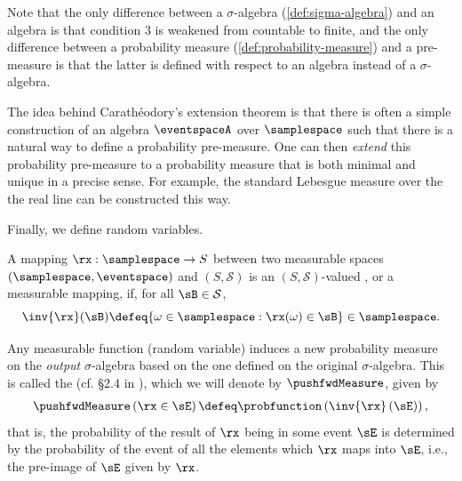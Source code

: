 Note that the only difference between a $\sigma$-algebra (\cref{def:sigma-algebra}) and an algebra is that condition 3 is weakened from countable to finite, and the only difference between a probability measure (\cref{def:probability-measure}) and a pre-measure is that the latter is defined with respect to an algebra instead of a $\sigma$-algebra.

The idea behind Carath\'eodory's extension theorem is that there is often a simple construction of an algebra $\eventspaceA$ over $\samplespace$ such that there is a natural way to define a probability pre-measure.
One can then \emph{extend} this probability pre-measure to a probability measure that is both minimal and unique in a precise sense. 
For example, the standard Lebesgue measure over the the real line can be constructed this way.

Finally, we define random variables.
\begin{definition}\label{def:rv}
A mapping $\rx:\samplespace\to S$ between two measurable spaces $(\samplespace, \eventspace)$ and $(S,\mathcal{S})$ is an $(S,\mathcal{S})$-valued , or a measurable mapping, if, for all $\sB \in \mathcal{S}$,
\begin{equation}
    \inv{\rx}(\sB)\defeq \{\omega\in\samplespace:\rx(\omega)\in \sB\} \in \samplespace.
\end{equation}
\end{definition}

Any measurable function (random variable) induces a new probability measure on the \emph{output} $\sigma$-algebra based on the one defined on the original $\sigma$-algebra.
This is called the  (cf. \S2.4 in \citealp{Tao2011}), which we will denote by $\pushfwdMeasure$, given by
\begin{align} 
    \pushfwdMeasure\left(\rx\in \sE\right)\defeq\probfunction\left(\inv{\rx}\left(\sE\right)\right),
\end{align}
that is, the probability of the result of $\rx$ being in some event $\sE$ is determined by the probability of the event of all the elements which $\rx$ maps into $\sE$, i.e., the pre-image of $\sE$ given by $\rx$.

